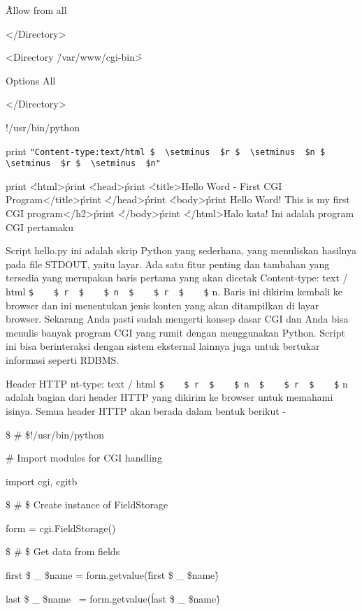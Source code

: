 \begin {enumerate}
\begin {enumerate}
\~\~ Allow from all

</Directory>

<Directory \"/var/www/cgi-bin\">

Options All

</Directory>

!/usr/bin/python

print \verb|"Content-type:text/html $  \setminus  $r $  \setminus  $n $  \setminus  $r $  \setminus  $n"|

print \'<html>\'

print \'<head>\'

print \'<title>Hello Word - First CGI Program</title>\'

print \'</head>\'

print \'<body>\'

print \'<h2>Hello Word! This is my first CGI program</h2>\'

print \'</body>\'

print \'</html>\'

Halo kata! Ini adalah program CGI pertamaku

Script hello.py ini adalah skrip Python yang sederhana, yang menuliskan hasilnya pada file STDOUT, yaitu layar. Ada satu fitur penting dan tambahan yang tersedia yang merupakan baris pertama yang akan dicetak Content-type: text / html  \verb|$    $ r  $    $ n  $    $ r  $    $| n. Baris ini dikirim kembali ke browser dan ini menentukan jenis konten yang akan ditampilkan di layar browser. Sekarang Anda pasti sudah mengerti konsep dasar CGI dan Anda bisa menulis banyak program CGI yang rumit dengan menggunakan Python. Script ini bisa berinteraksi dengan sistem eksternal lainnya juga untuk bertukar informasi seperti RDBMS.

Header HTTP
nt-type: text / html  \verb|$    $ r  $    $ n  $    $ r  $    $| n adalah bagian dari header HTTP yang dikirim ke browser untuk memahami isinya. Semua header HTTP akan berada dalam bentuk berikut -

 \$  \#  \$!/usr/bin/python

 $  \#  $ Import modules for CGI handling

import cgi, cgitb

 \$  \#  \$ Create instance of FieldStorage

form = cgi.FieldStorage()

 \$  \#  \$ Get data from fields

first \$  \_  \$name = form.getvalue(\'first \$  \_  \$name\')

last \$  \_  \$name~ = form.getvalue(\'last \$  \_  \$name\')


\end{enumerate}
\end{enumerate}
